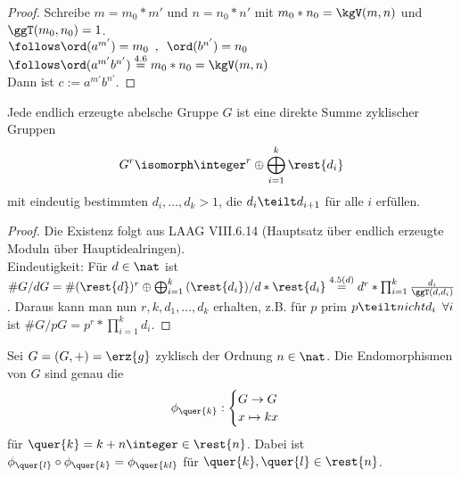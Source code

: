 \begin{proof}
	Schreibe $m = m_0 * m'$ und $n = n_0 * n'$ mit $m_0 * n_0 = \kgV(m,n)$ und $\ggT(m_0,n_0) = 1$. \\
	$\follows \ord(a^{m'}) = m_0 \enspace , \enspace \ord(b^{n'}) = n_0$ \\
	$\follows \ord(a^{m'}b^{n'}) \overset{4.6}{=} m_0*n_0 = \kgV(m,n)$ \\
	Dann ist $c:= a^{m'}b^{n'}$.
\end{proof}
%
\begin{thm}
	Jede endlich erzeugte abelsche Gruppe $G$ ist eine direkte Summe zyklischer Gruppen
	\begin{align*}
		G^r \isomorph \integer^r \oplus \bigoplus\limits_{i=1}^{k}{\rest{d_i}}
	\end{align*}
	mit eindeutig bestimmten $d_i, \dots, d_k > 1$, die $d_i \teilt d_{i+1}$ für alle $i$ erfüllen.
\end{thm}
\begin{proof}
	Die Existenz folgt aus LAAG VIII.6.14 (Hauptsatz über endlich erzeugte Moduln über Hauptidealringen). \\
	Eindeutigkeit: Für $d \in \nat$ ist $\# G/dG = \# (\rest{d})^r \oplus \bigoplus_{i=1}^{k}{(\rest{d_i})/d*\rest{d_i}} \overset{4.5(d)}{=} d^r * \prod_{i=1}^{k}{\frac{d_i}{\ggT(d,d_i)}}$. Daraus kann man nun $r,k,d_1, \dots, d_k$ erhalten, z.B. für $p$ prim $p \teilt nicht d_i \enspace \forall i$ ist $\# G/pG = p^r * \prod_{i=1}^{k}{d_i}$.
\end{proof}
%
\begin{lemma}
	Sei $G = (G,+) = \erz{g}$ zyklisch der Ordnung $n \in  \nat$. Die Endomorphismen von $G$ sind genau die 
	\begin{align*}
		\phi_{\quer{k}}: \begin{cases}
		G \to G \\
		x \mapsto kx
		\end{cases}
	\end{align*}
	für $\quer{k} = k +n\integer \in \rest{n}$. Dabei ist $\phi_{\quer{l}} \circ \phi_{\quer{k}} = \phi_{\quer{kl}}$ für $\quer{k}, \quer{l} \in \rest{n}$.
\end{lemma}
